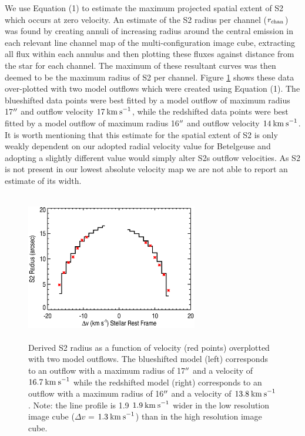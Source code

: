 \documentclass[iop]{emulateapj}
\begin{document}
We use Equation (1) to estimate the maximum projected spatial extent of S2 which occurs at zero velocity. An estimate of the S2 radius per channel ($r_{\rm{chan}}$) was found by creating annuli of increasing radius around the central emission in each relevant line channel map of the multi-configuration image cube, extracting all flux within each annulus and then plotting these fluxes against distance from the star for each channel. The maximum of these resultant curves was then deemed to be the maximum radius of S2 per channel. Figure \ref{fig:fig5} shows these data over-plotted with two model outflows which were created using Equation (1). The blueshifted data points were best fitted by a model outflow of maximum radius 17$\mbox{$^{\prime\prime}$}$ and outflow velocity $17\>{\rm km\>s}^{-1}$, while the redshifted data points were best fitted by a model outflow of maximum radius 16$\mbox{$^{\prime\prime}$}$ and outflow velocity $14\>{\rm km\>s}^{-1}$. It is worth mentioning that this estimate for the spatial extent of S2 is only weakly dependent on our adopted radial velocity value for Betelgeuse and adopting a slightly different value would simply alter S2s outflow velocities. As S2 is not present in our lowest absolute velocity map we are not able to report an estimate of its width.

\begin{figure}
\includegraphics[trim=45pt 0pt 80pt 10pt, width=7.5cm, height=6.5cm]{f13.eps}
\caption{Derived S2 radius as a function of velocity (red points) overplotted with two model outflows. The blueshifted model (left) corresponds to an outflow with a maximum radius of 17$\mbox{$^{\prime\prime}$}$ and a velocity of $16.7\>{\rm km\>s}^{-1}$ while the redshifted model (right) corresponds to an outflow with a maximum radius of 16$\mbox{$^{\prime\prime}$}$ and a velocity of $13.8\>{\rm km\>s}^{-1}$. Note: the line profile is 1.9 $1.9\>{\rm km\>s}^{-1}$ wider in the low resolution image cube ($\Delta v$ = $1.3\>{\rm km\>s}^{-1}$) than in the high resolution image cube.}
\label{fig:fig5}
\end{figure}
\end{document}
